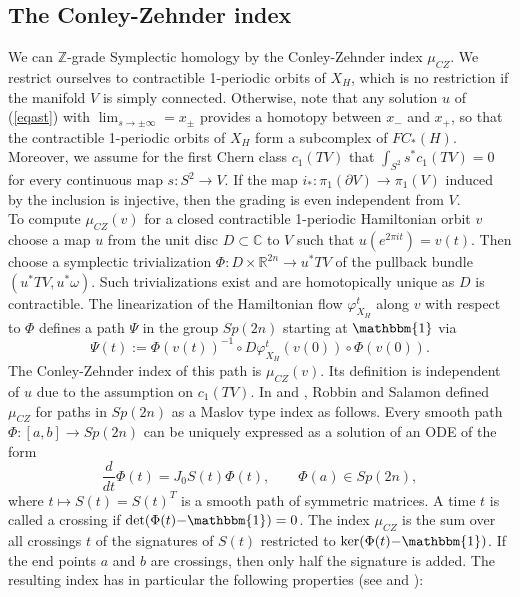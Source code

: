 \documentclass[a4paper,12pt,bibliography=totocnumbered,titlepage=false,abstracton,bookmarksnumbered=true]{scrartcl}
\theoremstyle{definition}
\begin{document}
\subsection{The Conley-Zehnder index}\label{secConZeh}
We can $\mathbb{Z}$-grade Symplectic homology by the Conley-Zehnder index $\mu_{CZ}$. We restrict ourselves to contractible 1-periodic orbits of $X_H$, which is no restriction if the manifold $V$ is simply connected. Otherwise, note that any solution $u$ of (\ref{eqast}) with $\lim_{s\rightarrow\pm\infty}=x_\pm$ provides a homotopy between $x_-$ and $x_+$, so that the contractible 1-periodic orbits of $X_H$ form a subcomplex of $FC_\ast(H)$.\\
Moreover, we assume for the first Chern class $c_1(TV)$ that $\int_{S^2} s^\ast c_1(TV)=0$ for every continuous map $s:S^2\rightarrow V$. If the map $i_\ast:\pi_1(\partial V)\rightarrow\pi_1(V)$ induced by the inclusion is injective, then the grading is even independent from $V$.\\
To compute $\mu_{CZ}(v)$ for a closed contractible 1-periodic Hamiltonian orbit $v$ choose a map $u$ from the unit disc $D\subset\mathbb{C}$ to $V$ such that $u(e^{2\pi it})=v(t)$. Then choose a symplectic trivialization $\Phi:D{\times}\mathbb{R}^{2n}\rightarrow u^\ast TV$ of the pullback bundle $(u^\ast TV, u^\ast \omega)$. Such trivializations exist and are homotopically unique as $D$ is contractible. The linearization of the Hamiltonian flow $\varphi^t_{X_H}$ along $v$ with respect to $\Phi$ defines a path $\Psi$ in the group $Sp(2n)$ starting at $\mathbbm{1}$ via
\[\Psi(t):=\Phi(v(t))^{-1}\circ D\varphi^t_{X_H}(v(0))\circ\Phi(v(0)).\]
The Conley-Zehnder index of this path is $\mu_{CZ}(v)$. Its definition is independent of $u$ due to the assumption on $c_1(TV)$. In \cite{RoSa} and \cite{Sal}, Robbin and Salamon defined $\mu_{CZ}$ for paths in $Sp(2n)$ as a Maslov type index as follows. Every smooth path $\Phi:[a,b]\rightarrow Sp(2n)$ can be uniquely expressed as a solution of an ODE of the form
\[\frac{d}{dt}\Phi(t)=J_0 S(t)\Phi(t),\qquad \Phi(a)\in Sp(2n),\]
where $t\mapsto S(t)=S(t)^T$ is a smooth path of symmetric matrices.
A time $t$ is called a crossing if $\det(\Phi(t){-}\mathbbm{1})=0$. The index $\mu_{CZ}$ is the sum over all crossings $t$ of the signatures of $S(t)$ restricted to $\ker (\Phi(t){-}\mathbbm{1})$. If the end points $a$ and $b$ are crossings, then only half the signature is added. The resulting index has in particular the following properties (see \cite{RoSa} and \cite{Gutt1}):
\end{document}
